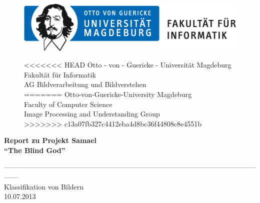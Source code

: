 \documentclass[liststotoc,11pt,a4paper]{article}
\begin{document}
\begin{figure}[htbp]
\begin{minipage}[t]{5cm}
\vspace{0pt}
\includegraphics{ovgu_logo_fak_inf}
\end{minipage}
\hfill
\begin{minipage}[t]{8cm}
\vspace{0pt}
\begin{flushright}     
<<<<<<< HEAD
Otto - von - Guericke - Universität Magdeburg\\Fakultät für Informatik\\AG Bildverarbeitung und Bildverstehen\\
=======
Otto-von-Guericke-University Magdeburg\\Faculty of Computer Science\\Image Processing and Understanding Group\\
>>>>>>> c13a07fb327c4412eba4d8bc36f44808c8e4551b
\end{flushright}
\end{minipage}
\end{figure}
\vspace{50pt}

\begin{center}
\huge\bfseries Report zu Projekt Samael\\
\vspace{10pt}
\large"`The Blind God"'\\
\end{center}
\begin{center}
\vspace{20pt}
------------------------------------------------------------------------------------------------------------------\\[30pt]
\large Klassifikation von Bildern\\
\vspace{10pt}
\normalsize 10.07.2013 \\[220pt] 
\end {center}
\end{document}
